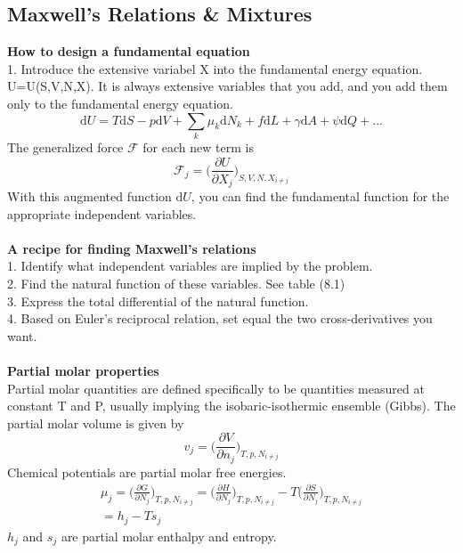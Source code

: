 \documentclass[8pt]{article}
\numberwithin{equation}{section}
\begin{document}
\begin{multicols}{2}
\section{Maxwell's Relations \& Mixtures}
\textbf{How to design a fundamental equation} \\
1. Introduce the extensive variabel X into the fundamental energy equation. U=U(S,V,N,X). It is always extensive variables that you add, and you add them only to the fundamental energy equation. 
\begin{equation}
\mathrm{d}U=T\mathrm{d}S-p\mathrm{d}V+\sum_{k} \mu_{k}\mathrm{d}N_{k}+f\mathrm{d}L+\gamma\mathrm{d}A+\psi\mathrm{d}Q+... \tag{9.1}
\end{equation}
The generalized force $\mathscr{F}$ for each new term is 
\begin{equation}
\mathscr{F}_{j}=\bigg( \frac{\partial U}{\partial X_{j}} \bigg)_{S,V,N,X_{i\neq j}} \tag{9.2}
\end{equation} 
With this augmented function $\mathrm{d}U$, you can find the fundamental function for the appropriate independent variables. \\\\
\textbf{A recipe for finding Maxwell's relations} \\
1. Identify what independent variables are implied by the problem. \\
2. Find the natural function of these variables. See table (8.1) \\
3. Express the total differential of the natural function. \\
4. Based on Euler's reciprocal relation, set equal the two cross-derivatives you want. \\ \\
\textbf{Partial molar properties} \\
Partial molar quantities are defined specifically to be quantities measured at constant T and P, usually implying the isobaric-isothermic ensemble (Gibbs). The partial molar volume is given by 
\begin{equation}
v_{j}=\bigg( \frac{\partial V}{\partial n_{j}} \bigg)_{T,p,N_{i\neq j}} \tag{9.29}
\end{equation}
Chemical potentials are partial molar free energies.
\begin{gather}
\mu_{j}=\bigg( \frac{\partial G}{\partial N_{j}} \bigg)_{T,p,N_{i\neq j}}=\bigg( \frac{\partial H}{\partial N_{j}} \bigg)_{T,p,N_{i\neq j}} - T\bigg( \frac{\partial S}{\partial N_{j}} \bigg)_{T,p,N_{i\neq j}} \tag{-}\\ = h_{j}-Ts_{j}  \tag{9.32}
\end{gather}
$h_{j}$ and $s_{j}$ are partial molar enthalpy and entropy. 

\end{multicols}
\end{document}
